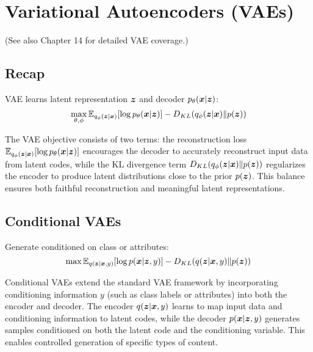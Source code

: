 
\section{Variational Autoencoders (VAEs) }
\label{sec:vaes}

(See also Chapter 14 for detailed VAE coverage.)

\subsection{Recap}

VAE learns latent representation $\boldsymbol{z}$ and decoder $p_{\theta}(\boldsymbol{x}|\boldsymbol{z})$:
\begin{equation}
\max_{\theta, \phi} \mathbb{E}_{q_{\phi}(\boldsymbol{z}|\boldsymbol{x})}[\log p_{\theta}(\boldsymbol{x}|\boldsymbol{z})] - D_{KL}(q_{\phi}(\boldsymbol{z}|\boldsymbol{x}) \| p(\boldsymbol{z}))
\end{equation}

The VAE objective consists of two terms: the reconstruction loss $\mathbb{E}_{q_{\phi}(\boldsymbol{z}|\boldsymbol{x})}[\log p_{\theta}(\boldsymbol{x}|\boldsymbol{z})]$ encourages the decoder to accurately reconstruct input data from latent codes, while the KL divergence term $D_{KL}(q_{\phi}(\boldsymbol{z}|\boldsymbol{x}) \| p(\boldsymbol{z}))$ regularizes the encoder to produce latent distributions close to the prior $p(\boldsymbol{z})$. This balance ensures both faithful reconstruction and meaningful latent representations.

\subsection{Conditional VAEs}

Generate conditioned on class or attributes:
\begin{equation}
\max \mathbb{E}_{q(\boldsymbol{z}|\boldsymbol{x}, y)}[\log p(\boldsymbol{x}|\boldsymbol{z}, y)] - D_{KL}(q(\boldsymbol{z}|\boldsymbol{x}, y) \| p(\boldsymbol{z}))
\end{equation}

Conditional VAEs extend the standard VAE framework by incorporating conditioning information $y$ (such as class labels or attributes) into both the encoder and decoder. The encoder $q(\boldsymbol{z}|\boldsymbol{x}, y)$ learns to map input data and conditioning information to latent codes, while the decoder $p(\boldsymbol{x}|\boldsymbol{z}, y)$ generates samples conditioned on both the latent code and the conditioning variable. This enables controlled generation of specific types of content.

